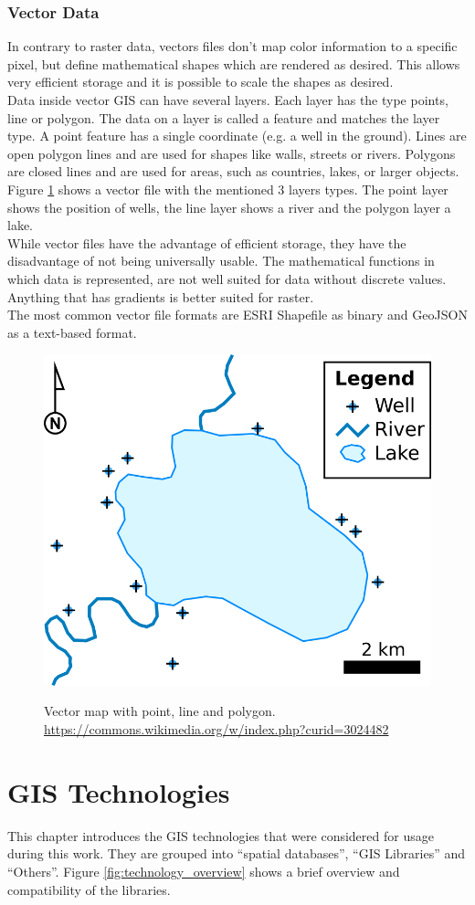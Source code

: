 \subsubsection{Vector Data}
In contrary to raster data, vectors files don't map color information to a specific pixel, but define mathematical shapes which are rendered as desired. This allows very efficient storage and it is possible to scale the shapes as desired.\\
Data inside vector GIS can have several layers. Each layer has the type points, line or polygon. The data on a layer is called a feature and matches the layer type. A point feature has a single coordinate (e.g. a well in the ground). Lines are open polygon lines and are used for shapes like walls, streets or rivers. Polygons are closed lines and are used for areas, such as countries, lakes, or larger objects. Figure \ref{img:vector} shows a vector file with the mentioned 3 layers types. The point layer shows the position of wells, the line layer shows a river and the polygon layer a lake.\\
While vector files have the advantage of efficient storage, they have the disadvantage of not being universally usable. The mathematical functions in which data is represented, are not well suited for data without discrete values. Anything that has gradients is better suited for raster.\\
The most common vector file formats are ESRI Shapefile as binary and GeoJSON as a text-based format.

\begin{figure}[H]
	\centering
	\includegraphics[width=0.4\columnwidth]{res/vector-map}\\
	\caption[]{Vector map with point, line and polygon. \url{https://commons.wikimedia.org/w/index.php?curid=3024482}}
	\label{img:vector}
\end{figure}



\section{GIS Technologies}
This chapter introduces the GIS technologies that were considered for usage during this work. They are grouped into \enquote{spatial databases}, \enquote{GIS Libraries} and \enquote{Others}. Figure \ref{fig:technology_overview} shows a brief overview and compatibility of the libraries.

